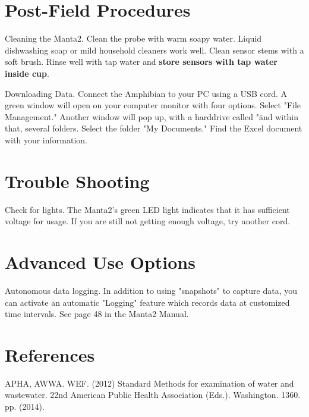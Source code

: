 \documentclass[12pt]{../SOP3}\usepackage[]{graphicx}\usepackage[]{color}
\begin{document}
\section{Post-Field Procedures}

\NP Cleaning the Manta2. Clean the probe with warm soapy water. Liquid dishwashing soap or mild household cleaners work well. Clean sensor stems with a soft brush. Rinse well with tap water and \textbf{store sensors with tap water inside cup}.

\NP Downloading Data. Connect the Amphibian to your PC using a USB cord. A green window will open on your computer monitor with four options. Select "File Management." Another window will pop up, with a harddrive called "\" and within that, several folders. Select the folder "My Documents." Find the Excel document with your information.

\section{Trouble Shooting}

\NP Check for lights. The Manta2's green LED light indicates that it has sufficient voltage for usage. If you are still not getting enough voltage, try another cord.

\section{Advanced Use Options}

 \NP Autonomous data logging. In addition to using "snapshots" to capture data, you can activate an automatic "Logging" feature which records data at customized time intervals. See page 48 in the Manta2 Manual.

\section{References}

\NP APHA, AWWA. WEF. (2012) Standard Methods for examination of water and wastewater. 22nd American Public Health Association (Eds.). Washington. 1360. pp. (2014).
\end{document}
